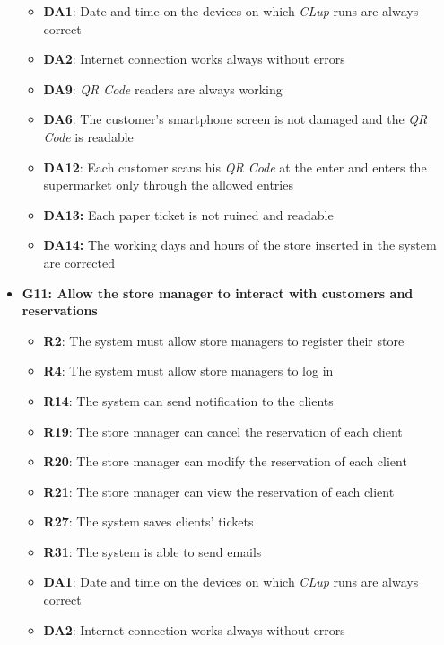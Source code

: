 \documentclass{article}
\begin{document}
\begin{itemize}
\begin{itemize}
						\item {\bfseries DA1}: Date and time on the devices on which \emph{CLup} runs are always correct
						\item {\bfseries DA2}: Internet connection works always without errors
						\item {\bfseries DA9}: \emph{QR Code} readers are always working
						\item{\bfseries DA6}: The customer’s smartphone screen is not damaged and the \emph{QR Code} is readable
						\item {\bfseries DA12}: Each customer scans his \emph{QR Code} at the enter and enters the supermarket only through the allowed entries
						\item {\bfseries DA13:} Each paper ticket is not ruined and readable
						\item {\bfseries DA14:} The working days and hours of the store inserted in the system are corrected
					
					\end{itemize}

				\item {\bfseries G11: Allow the store manager to interact with customers and reservations}	

					\begin{itemize}
						\item {\bfseries R2}: The system must allow store managers to register their store
						\item {\bfseries R4}: The system must allow store managers to log in
						\item {\bfseries R14}: The system can send notification to the clients
						\item {\bfseries R19}: The store manager can cancel the reservation of each client
						\item {\bfseries R20}: The store manager can modify the reservation of each client
						\item {\bfseries R21}: The store manager can view the reservation of each client
						\item {\bfseries R27}: The system saves clients' tickets
						\item{\bfseries R31}: The system is able to send emails \\
		
						\item {\bfseries DA1}: Date and time on the devices on which \emph{CLup} runs are always correct
						\item {\bfseries DA2}: Internet connection works always without errors
						\newpage
		
					\end{itemize}

			\end{itemize}
\end{document}
